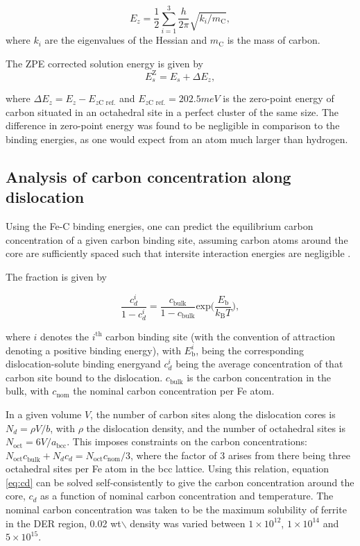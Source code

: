 \documentclass[a4paper,11pt]{article}
\begin{document}
\[ E_z = \frac{1}{2} \sum_{i=1}^3 \frac{h}{2\pi} \sqrt{ k_i /
    m_{\text{C}} },  \]
where \(k_i\) are the eigenvalues of the Hessian and \(m_\text{C}\) is
the mass of carbon. 

The ZPE corrected solution energy is given by 
\[ E^{\text{Z}}_{s} = E_s + \Delta E_z,  \]

where \(\Delta E_z = E_z - E_{z\text{C ref.}}\) and \(E_{z\text{C ref.}} = 202.5 meV\) is the zero-point energy of carbon
situated in an octahedral site in a perfect cluster of the same size. The difference in
zero-point energy was found to be negligible in comparison to the binding energies, as one would
expect from an atom much larger than hydrogen. 

\subsection{Analysis of carbon concentration along dislocation}
\label{sec:orgad1bc41}

Using the Fe-C binding energies, one can predict the equilibrium carbon concentration of a given carbon
binding site, assuming carbon atoms around the core are sufficiently spaced such that intersite
interaction energies are negligible \cite{Ventelon2015}.

The fraction is given by 

\[  \frac{ c_d^{i} }{1 -  c_d^{i} } = \frac{ c_{\text{bulk}}^{} }{1 - c_{\text{bulk}} } \text{exp} \Big( 
    \frac{E_{\text{b}} }{k_{\text{B}}T}  \Big),     \label{eq:cd}\]


where \(i\) denotes the \(i^{\text{th}}\) carbon binding site (with the convention of attraction
denoting a positive binding energy), with \(E_{\text{b}}^{i}\), being the
corresponding dislocation-solute binding energyand \(c_d^{i}\) being the average concentration of that carbon
site bound to the dislocation. \(c_{\text{bulk}}^{}\) is the carbon concentration in the bulk, with
\(c_{\text{nom}}^{}\) the nominal carbon concentration per Fe atom.


In a given volume \(V\), the number of carbon sites along the dislocation cores is \(N_d = \rho V/b\),
with \(\rho\) the dislocation density, and the number of octahedral sites is \(N_{\text{oct}} =
    6V/a_{\text{bcc}}\). This imposes constraints on the carbon concentrations: \(N_{\text{oct}}
    c_{\text{bulk}}^{} + N_d c_d = N_{\text{oct}} c_{\text{nom}}/3\), where the factor of 3 arises from there being
three octahedral sites per Fe atom in the bcc lattice. Using this relation, equation \ref{eq:cd} can be solved
self-consistently to give the carbon concentration around the core, \(c_d\) as a function of
nominal carbon concentration and temperature. The nominal carbon concentration was taken to be
the maximum solubility of ferrite in the DER region, 0.02 wt$\backslash$%
density was varied between \(1\times10^{12}\), \(1\times10^{14}\) and \(5\times10^{15}\).
\end{document}
